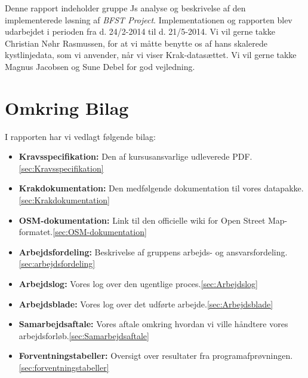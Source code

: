Denne rapport indeholder gruppe Js analyse og beskrivelse af den implementerede løsning af \emph{BFST Project}. Implementationen og rapporten blev udarbejdet i perioden fra d. 24/2-2014 til d. 21/5-2014.
Vi vil gerne takke Christian Nøhr Rasmussen, for at vi måtte benytte os af hans skalerede kystlinjedata, som vi anvender, når vi viser Krak-datasættet. Vi vil gerne takke Magnus Jacobsen og Sune Debel for god vejledning.

\section{Omkring Bilag}
I rapporten har vi vedlagt følgende bilag:
\begin{itemize}
	\item \textbf{Kravsspecifikation:} Den af kursusansvarlige udleverede PDF.\ref{sec:Kravsspecifikation}
	\item \textbf{Krakdokumentation:} Den medfølgende dokumentation til vores datapakke.\ref{sec:Krakdokumentation}
	\item \textbf{OSM-dokumentation:} Link til den officielle wiki for Open Street Map-formatet.\ref{sec:OSM-dokumentation}
	\item \textbf{Arbejdsfordeling:} Beskrivelse af gruppens arbejds- og ansvarsfordeling.\ref{sec:arbejdsfordeling}
	\item \textbf{Arbejdslog:} Vores log over den ugentlige proces.\ref{sec:Arbejdslog}
	\item \textbf{Arbejdsblade:} Vores log over det udførte arbejde.\ref{sec:Arbejdsblade}
	\item \textbf{Samarbejdsaftale:} Vores aftale omkring hvordan vi ville håndtere vores arbejdsforløb.\ref{sec:Samarbejdsaftale}
	\item \textbf{Forventningstabeller:} Oversigt over resultater fra programafprøvningen.\ref{sec:forventningstabeller}
\end{itemize}

